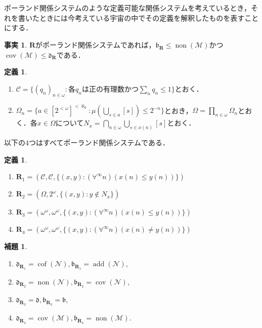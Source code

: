 \documentclass[uplatex,dvipdfmx]{jsarticle}
\newcommand{\non}{\operatorname{non}}
\newcommand{\cov}{\operatorname{cov}}
\newcommand{\add}{\operatorname{add}}
\newcommand{\cof}{\operatorname{cof}}
\newcommand{\nul}{\mathcal{N}}
\newcommand{\meager}{\mathcal{M}}
\newcommand{\frakb}{\mathfrak{b}}
\newcommand{\frakd}{\mathfrak{d}}
\newcommand{\relR}{\mathbf{R}}
\theoremstyle{definition}
\newtheorem{defi}[thm]{定義}
\newtheorem{lem}[thm]{補題}
\newtheorem{fact}[thm]{事実}
\begin{document}
	ポーランド関係システムのような定義可能な関係システムを考えているとき，それを書いたときには今考えている宇宙の中でその定義を解釈したものを表すことにする．

	\begin{fact}
		$\relR$がポーランド関係システムであれば，$\frakb_\relR \le \non(\meager)$かつ$\cov(\meager) \le \frakd_\relR$である．
	\end{fact}

	\begin{defi}
		\begin{enumerate}
			\item $\mathcal{C} = \{ (q_n)_{n \in \omega}	 : \text{各}q_n\text{は正の有理数かつ} \sum_n q_n \le 1 \}$とおく．
			\item $\Omega_n = \{ a \in [2^{<\omega}]^{<\aleph_0} : \mu(\bigcup_{s \in a} [s]) \le 2^{-n} \}$とおき，$\Omega = \prod_{n \in \omega} \Omega_n$とおく．各$x \in \Omega$について$N_x = \bigcap_{n \in \omega} \bigcup_{s \in x(n)} [s]$とおく．
		\end{enumerate}
	\end{defi}

	以下の4つはすべてポーランド関係システムである．
	
	\begin{defi}
		\begin{enumerate}
			\item $\relR_1 = (\mathcal{C}, \mathcal{C}, \{(x,y) : (\forall^\infty n) (x(n) \le y(n))\})$
			\item $\relR_2 = (\Omega, 2^\omega, \{ (x, y) : y \not \in N_x \})$
			\item $\relR_3 = (\omega^\omega, \omega^\omega, \{ (x,y) : (\forall^\infty n)(x(n) \le y(n))\})$
			\item $\relR_4 = (\omega^\omega, \omega^\omega, \{ (x,y) : (\forall^\infty n)(x(n) \ne y(n)) \})$
		\end{enumerate}
	\end{defi}

	\begin{lem}
		\begin{enumerate}
			\item $\frakd_{\relR_1} = \cof(\nul), \frakb_{\relR_1} = \add(\nul)$,
			\item $\frakd_{\relR_2} = \non(\nul), \frakb_{\relR_2} = \cov(\nul)$,
			\item $\frakd_{\relR_3} = \frakd, \frakb_{\relR_3} = \frakb$,
			\item $\frakd_{\relR_4} = \cov(\meager), \frakb_{\relR_4} = \non(\meager)$.
		\end{enumerate}
	\end{lem}
	
\end{document}
